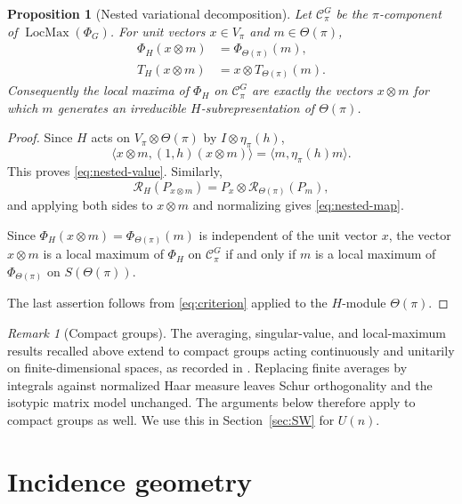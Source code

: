 \documentclass[10pt]{amsart}
\newtheorem{proposition}[theorem]{Proposition}
\theoremstyle{remark}
\newtheorem{remark}[theorem]{Remark}
\DeclareMathOperator{\LocMax}{LocMax}
\newcommand{\ip}[2]{\langle #1,#2\rangle}
\begin{document}
\begin{proposition}[Nested variational decomposition]\label{prop:nested}
Let $\mathcal C_\pi^G$ be the $\pi$-component of $\LocMax(\Phi_G)$. For unit vectors
$x\in V_\pi$ and $m\in\Theta(\pi)$,
\begin{align}
 \Phi_H(x\otimes m)&=\Phi_{\Theta(\pi)}(m),\label{eq:nested-value}\\
 T_H(x\otimes m)&=x\otimes T_{\Theta(\pi)}(m).\label{eq:nested-map}
\end{align}
Consequently the local maxima of $\Phi_H$ on $\mathcal C_\pi^G$ are exactly the vectors $x\otimes m$ for which $m$
generates an irreducible $H$-subrepresentation of $\Theta(\pi)$.
\end{proposition}

\begin{proof}
Since $H$ acts on $V_\pi\otimes\Theta(\pi)$ by $I\otimes\eta_\pi(h)$,
\[
 \ip{x\otimes m}{(1,h)(x\otimes m)}=\ip{m}{\eta_\pi(h)m}.
\]
This proves \eqref{eq:nested-value}. Similarly,
\[
 \mathcal R_H(P_{x\otimes m})
 =P_x\otimes\mathcal R_{\Theta(\pi)}(P_m),
\]
and applying both sides to $x\otimes m$
and normalizing gives \eqref{eq:nested-map}.

Since $\Phi_H(x\otimes m)=\Phi_{\Theta(\pi)}(m)$
is independent of the unit vector $x$,
the vector $x\otimes m$ is a local maximum of
$\Phi_H$ on $\mathcal C_\pi^G$ if and only if $m$ is a local
maximum of $\Phi_{\Theta(\pi)}$ on $S(\Theta(\pi))$.

The last assertion follows from \eqref{eq:criterion}
applied to the $H$-module $\Theta(\pi)$.
\end{proof}

\begin{remark}[Compact groups]\label{rem:compact}
The averaging, singular-value, and local-maximum results recalled above extend to compact
groups acting continuously and unitarily on finite-dimensional spaces, as recorded in
\cite[Remark~2]{HungKang2026}. Replacing finite averages by integrals against normalized Haar
measure leaves Schur orthogonality and the isotypic matrix model unchanged. The arguments below
therefore apply to compact groups as well. We use this in Section~\ref{sec:SW} for $U(n)$.
\end{remark}

\section{Incidence geometry}\label{sec:incidence}
\end{document}
